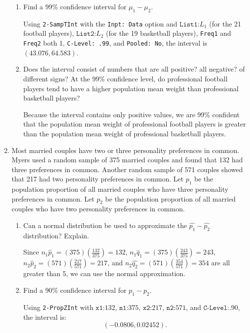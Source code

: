 \begin{enumerate}
\begin{enumerate}
	\item Find a 99\% confidence interval for $\mu_1 - \mu_2$.  
	
	{\answer Using \texttt{2-SampTInt} with the \texttt{Inpt: Data} option and $\texttt{List1:} L_1$ (for the 21 football players), $\texttt{List2:} L_2$ (for the 19 basketball players), \texttt{Freq1} and \texttt{Freq2} both 1, \texttt{C-Level: .99}, and \texttt{Pooled: No}, the interval is $(43.076, 64.583)$.
	}  
	
	\item Does the interval consist of numbers that are all positive? all negative? of different signs? At the 99\% confidence level, do professional football players tend to have a higher population mean weight than professional basketball players?  
	
	{\answer Because the interval contains only positive values, we are 99\% confident that the population mean weight of professional football players is greater than the population mean weight of professional basketball players.
	}  
	\end{enumerate}

\newpage
	
\item Most married couples have two or three personality preferences in common. Myers used a random sample of 375 married couples and found that 132 had three preferences in common. Another random sample of 571 couples showed that 217 had two personality preferences in common. Let $p_1$ be the population proportion of all married couples who have three personality preferences in common. Let $p_2$ be the population proportion of all married couples who have two personality preferences in common.
	\begin{enumerate}
	\item Can a normal distribution be used to approximate the $\hat{p_1}- \hat{p_2}$ distribution? Explain.  
	
	{\answer Since $n_1\hat{p}_1 = (375)(\frac{132}{375}) = 132$, $n_1\hat{q}_1 = (375)(\frac{243}{375}) = 243$, $n_2\hat{p}_2 = (571)(\frac{217}{571}) = 217$, and $n_2\hat{q_2} = (571)(\frac{354}{571}) = 354$ are all greater than 5, we can use the normal approximation.
	}  
	
	\item Find a 90\% confidence interval for $p_1 -p_2$.  
	
	{\answer Using \texttt{2-PropZInt} with $\texttt{x1:} 132$, $\texttt{n1:}375$, $\texttt{x2:} 217$, $\texttt{n2:} 571$, and $\texttt{C-Level:} .90$, the interval is: $$(-0.0806, 0.02452).$$
	}  
	

\end{enumerate}
\end{enumerate}

